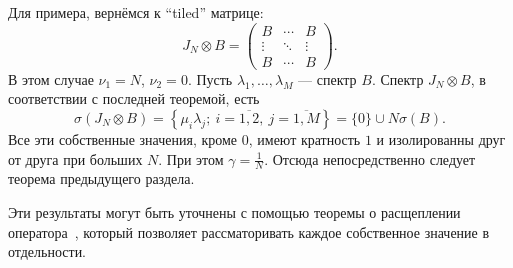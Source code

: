 \documentclass[12pt]{article}
\begin{document}
Для примера, вернёмся к ``tiled'' матрице:
\[
    J_N{\otimes}B =
    \begin{pmatrix}
        B & \cdots & B \\
        \vdots & \ddots & \vdots \\
        B & \cdots & B
    \end{pmatrix}.
\]
В этом случае
    \( \nu_1=N \),
    \( \nu_2=0 \).
Пусть \( \lambda_1,\ldots,\lambda_M \)
    --- спектр \( B \).
Спектр \( J_N{\otimes}B \), в соответствии с последней теоремой, есть
    \[
        \sigma(J_N{\otimes}B) = \left\{ \mu_i\lambda_j;\ i{=}\overline{1,2},\ j{=}\overline{1,M}\right\} = \{0\}\cup N\sigma(B).
    \]
Все эти собственные значения, кроме \( 0 \),
    имеют кратность \( 1 \)
    и изолированны друг от друга при больших \( N \).
При этом \( \gamma=\frac1N \).
Отсюда непосредственно следует теорема предыдущего раздела.

Эти результаты могут быть уточнены с помощью теоремы о расщеплении оператора~\cite{baskakov1987theorem},
    который позволяет рассматоривать каждое собственное значение в отдельности.
\end{document}
